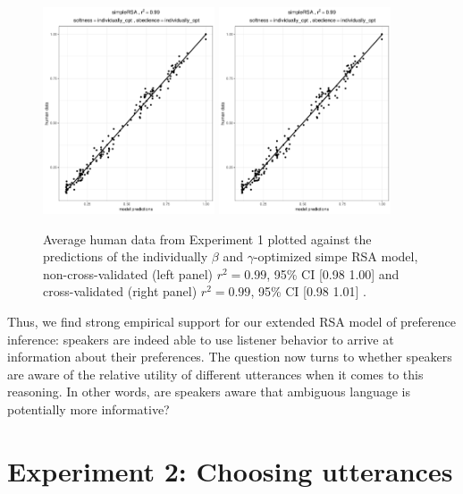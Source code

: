 \documentclass[10pt,a4paper]{article}
\begin{document}
\begin{figure}[ht]
	\centering
	\includegraphics[width=2in]{images/m5.pdf}
	\includegraphics[width=2in]{images/m8.pdf}
	\caption{Average human data from Experiment 1 plotted against the predictions of the individually $\beta$ and $\gamma$-optimized simpe RSA model, non-cross-validated (left panel) $r^{2}=0.99$, 95\% CI [0.98 1.00] and cross-validated (right panel) $r^{2}=0.99$, 95\% CI [0.98 1.01] .}\label{cross-validation}
\end{figure}

Thus, we find strong empirical support for our extended RSA model of preference inference: speakers are indeed able to use listener behavior to arrive at information about their preferences. The question now turns to whether speakers are aware of the relative utility of different utterances when it comes to this reasoning. In other words, are speakers aware that ambiguous language is potentially more informative?


\section{Experiment 2: Choosing utterances}
\end{document}
